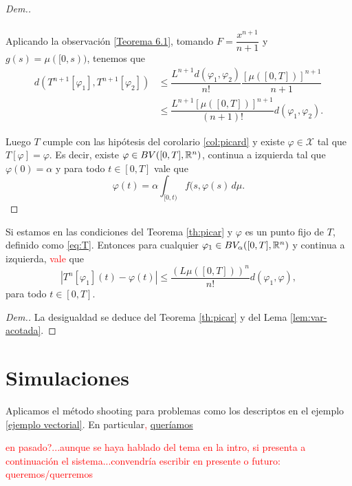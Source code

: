 \begin{proof}[Dem.]
\begin{enumerate}
\begin{equation*}
\begin{split}
    \end{split}
\end{equation*}
Aplicando la observación \ref{Teorema 6.1}, tomando $F=\dfrac{x^{n+1}}{n+1}$ y $g(s)=\mu([0,s))$, tenemos que
\begin{equation*}
    \begin{split}
d(T^{n+1}[\varphi_1],T^{n+1}[\varphi_2]) &\leq \dfrac{L^{n+1}d(\varphi_1,\varphi_2)}{n!}\dfrac{\left[\mu([0,T])\right]^{n+1}}{n+1}\\
&\leq \dfrac{L^{n+1}\left[\mu([0,T])\right]^{n+1}}{(n+1)!}d(\varphi_1,\varphi_2).
    \end{split}
\end{equation*}

\end{enumerate}
Luego $T$ cumple con las hipótesis del corolario \ref{col:picard} y existe $\varphi\in\mathcal{X}$ tal que $T[\varphi]=\varphi$. Es decir, existe $\varphi\in BV([0,T],\mathbb{R}^n)$, continua a izquierda tal que $\varphi(0)=\alpha$ y para todo $t\in[0,T]$ vale que
$$\varphi(t)=\alpha\int_{[0,t)}f(s,\varphi(s) \, d\mu.$$
\end{proof}

\begin{cor}
Si estamos en las condiciones del Teorema \ref{th:picar} y $\varphi$ es un punto fijo de $T$, definido como \eqref{eq:T}. Entonces para cualquier $\varphi_1\in BV_\alpha([0,T],\mathbb{R}^n)$ y continua a izquierda, \textcolor{red}{vale} que
    \begin{equation}
    |T^n[\varphi_1](t)-\varphi(t)|\leq \dfrac{\left(L\mu([0,T])\right)^n}{n!}d(\varphi_1,\varphi)   ,     
    \end{equation}
para todo $t\in[0,T].$
\end{cor}
\begin{proof}[Dem.]
La desigualdad se deduce del Teorema \ref{th:picar} y del Lema \ref{lem:var-acotada}.
\end{proof}






\section{Simulaciones}

Aplicamos el método shooting para problemas como los descriptos en el ejemplo \ref{ejemplo vectorial}. En particular\textcolor{red}{,} \underline{queríamos}

\textcolor{red}{en pasado?...aunque se haya hablado del tema en la intro, si presenta a continuación el sistema...convendría escribir en presente o futuro: queremos/querremos} 

